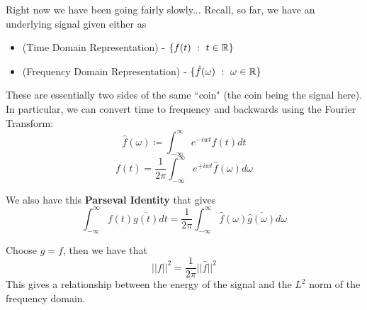 \documentclass{article}
\begin{document}
Right now we have been going fairly slowly... Recall, so far, we have an underlying signal given either as
\begin{itemize}
    \item (Time Domain Representation) - $\{f(t)\ :\ t \in \Rbb\}$
    \item (Frequency Domain Representation) - $\{\hat{f}(\omega)\ :\ \omega \in \mathbb{R}\}$
\end{itemize}
These are essentially two sides of the same ``coin" (the coin being the signal here).\\

In particular, we can convert time to frequency and backwards using the Fourier Transform:
\[\hat{f}(\omega) \coloneqq \int_{-\infty}^\infty e^{-iwt} f(t) dt\]
\[f(t) = \frac{1}{2\pi} \int_{-\infty}^\infty e^{+iwt} \hat{f}(\omega) d\omega\]

We also have this \textbf{Parseval Identity} that gives
\[\int_{-\infty}^\infty f(t) \overline{g(t)} dt = \frac{1}{2\pi} \int_{-\infty}^\infty \hat{f}(\omega) \overline{\hat{g}(\omega)} d\omega \]

\begin{corollary}
Choose $g = f$, then we have that
\[||f||^2 = \frac{1}{2\pi} ||\hat{f}||^2\]
This gives a relationship between the energy of the signal and the $L^2$ norm of the frequency domain.
\end{corollary}
\end{document}
